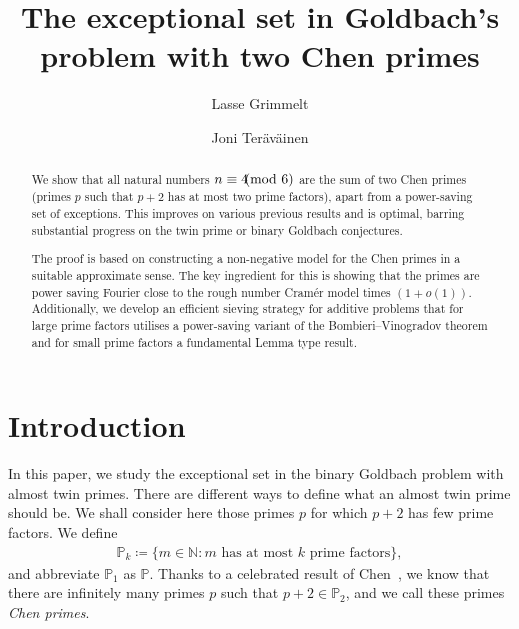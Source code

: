 \documentclass[12pt]{amsart}
\theoremstyle{definition}
\theoremstyle{remark}
\numberwithin{equation}{section}
\newcommand{\1}{\mathbf{1}}
\let\oldpmod\pmod
\renewcommand{\pmod}[1]{\hspace{-0.12cm}\oldpmod {#1}}
\begin{document}
\title{The exceptional set in Goldbach's problem with two Chen primes}
\newcommand{\blankbox}[2]{%
	\parbox{\columnwidth}{\centering
		\setlength{\fboxsep}{0pt}%
		\fbox{\raisebox{0pt}[#2]{\hspace{#1}}}%
	}%
}
\author{Lasse Grimmelt}
\address{Department of Pure Mathematics and Mathematical Statistics, University of Cambridge, Cambridge CB3 0WB, UK}


\author{Joni Ter\"{a}v\"{a}inen}
\address{Department of Pure Mathematics and Mathematical Statistics, University of Cambridge, Cambridge CB3 0WB, UK}


	
	
\begin{abstract} We show that all natural numbers $n\equiv 4\pmod 6$ are the sum of two Chen primes (primes $p$ such that $p+2$ has at most two prime factors), apart from a power-saving set of exceptions. This improves on various previous results and is optimal, barring substantial progress on the twin prime or binary Goldbach conjectures. 

The proof is based on constructing a non-negative model for the Chen primes in a suitable approximate sense. The key ingredient for this is showing that the primes are power saving Fourier close to the rough number Cram\'er model times $(1+o(1))$. Additionally, we develop an efficient sieving strategy for additive problems that for large prime factors utilises a power-saving variant of the Bombieri--Vinogradov theorem and for small prime factors a fundamental Lemma type result.

\end{abstract}




\maketitle

    \tableofcontents
	
\section{Introduction}
	
In this paper, we study the exceptional set in the binary Goldbach problem with almost twin primes. There are different ways to define what an almost twin prime should be. We shall consider here those primes $p$ for which $p+2$ has few prime factors. 
We define 
\begin{align*}
	\mathbb{P}_k\coloneqq \{m\in \mathbb{N} : m \text{ has at most } k \text{ prime factors} \},
\end{align*}
and abbreviate $\mathbb{P}_1$ as $\mathbb{P}$. Thanks to a celebrated result of Chen~\cite{chen}, we know that there are infinitely many primes $p$ such that $p+2\in \mathbb{P}_2$, and we call these primes \emph{Chen primes}. 
\end{document}
